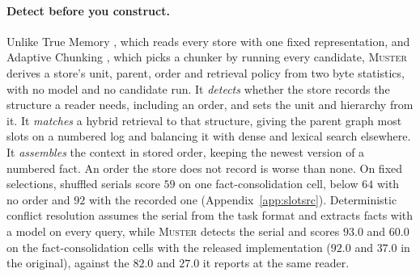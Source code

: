 \documentclass{article}
\newcommand{\sys}{\textsc{Muster}}
\begin{document}
\paragraph{Detect before you construct.} Unlike True Memory \cite{truememory}, which reads every store with one fixed representation, and Adaptive Chunking \cite{adaptivechunk}, which picks a chunker by running every candidate, \sys{} derives a store's unit, parent, order and retrieval policy from two byte statistics, with no model and no candidate run. It \emph{detects} whether the store records the structure a reader needs, including an order, and sets the unit and hierarchy from it. It \emph{matches} a hybrid retrieval to that structure, giving the parent graph most slots on a numbered log and balancing it with dense and lexical search elsewhere. It \emph{assembles} the context in stored order, keeping the newest version of a numbered fact. An order the store does not record is worse than none. On fixed selections, shuffled serials score $59$ on one fact-consolidation cell, below $64$ with no order and $92$ with the recorded one (Appendix~\ref{app:slotsrc}). Deterministic conflict resolution \cite{freshness} assumes the serial from the task format and extracts facts with a model on every query, while \sys{} detects the serial and scores $93.0$ and $60.0$ on the fact-consolidation cells with the released implementation ($92.0$ and $37.0$ in the original), against the $82.0$ and $27.0$ it reports at the same reader.
\end{document}
